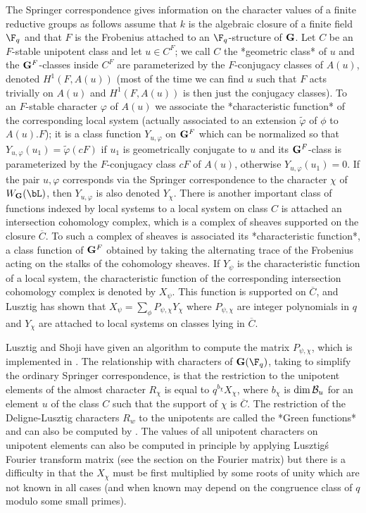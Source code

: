 The  Springer correspondence gives information on the character values of a
finite  reductive  groups  as  follows\:  assume  that $k$ is the algebraic
closure  of a finite field $\F_q$ and that $F$ is the Frobenius attached to
an  $\F_q$-structure of ${\bf G}$. Let $C$ be an $F$-stable unipotent class and
let  $u\in  C^F$;  we  call  $C$  the  *geometric  class*  of  $u$  and the
${\bf G}^F$-classes inside $C^F$ are parameterized by the $F$-conjugacy classes
of  $A(u)$, denoted $H^1(F,A(u))$  (most of the  time we can  find $u$ such
that  $F$  acts  trivially  on  $A(u)$  and  $H^1(F,A(u))$ is then just the
conjugacy  classes).  To  an  $F$-stable  character  $\varphi$ of $A(u)$ we
associate  the *characteristic function* of  the corresponding local system
(actually   associated  to  an  extension   $\tilde\varphi$  of  $\phi$  to
$A(u).F$);  it is a class function  $Y_{u,\varphi}$ on ${\bf G}^F$ which can be
normalized  so  that\:  $Y_{u,\varphi}(u_1)=\tilde\varphi(cF)$  if $u_1$ is
geometrically  conjugate to $u$  and its ${\bf G}^F$-class  is parameterized by
the  $F$-conjugacy class $cF$  of $A(u)$, otherwise $Y_{u,\varphi}(u_1)=0$.
If  the pair $u,\varphi$ corresponds via the Springer correspondence to the
character  $\chi$  of  $W_\bG(\bL)$,  then  $Y_{u,\varphi}$ is also denoted
$Y_\chi$.  There is another  important class of  functions indexed by local
systems\:  to  a  local  system  on  class  $C$ is attached an intersection
cohomology  complex, which is a complex of sheaves supported on the closure
$\overline   C$.  To   such  a   complex  of   sheaves  is  associated  its
*characteristic  function*, a class function  of ${\bf G}^F$ obtained by taking
the  alternating  trace  of  the  Frobenius  acting  on  the  stalks of the
cohomology  sheaves. If $Y_\psi$ is the  characteristic function of a local
system,  the  characteristic  function  of  the  corresponding intersection
cohomology  complex is denoted  by $X_\psi$. This  function is supported on
$\overline  C$, and Lusztig has  shown that $X_\psi=\sum_\phi P_{\psi,\chi}
Y_\chi$  where $P_{\psi,\chi}$ are integer  polynomials in $q$ and $Y_\chi$
are attached to local systems on classes lying in $\overline C$.

Lusztig   and  Shoji  have  given  an   algorithm  to  compute  the  matrix
$P_{\psi,\chi}$,  which is  implemented in  \CHEVIE. The  relationship with
characters  of  $\bG(\F_q)$,  taking  to  simplify  the  ordinary  Springer
correspondence,  is that the  restriction to the  unipotent elements of the
almost  character $R_\chi$ is equal  to $q^{b_\chi} X_\chi$, where $b_\chi$
is  $\dim {\mathcal B}_u$ for an element $u$ of  the class $C$ such that the support
of  $\chi$  is  $\overline  C$.  The  restriction  of  the  Deligne-Lusztig
characters $R_w$ to the unipotents are called the *Green functions* and can
also  be computed  by \CHEVIE.  The values  of all  unipotent characters on
unipotent elements can also be computed in principle by applying Lusztig\'s
Fourier  transform matrix (see the section on the Fourier matrix) but there
is a difficulty in that the $X_\chi$ must be first multiplied by some roots
of unity which are not known in all cases (and when known may depend on the
congruence class of $q$ modulo some small primes).

